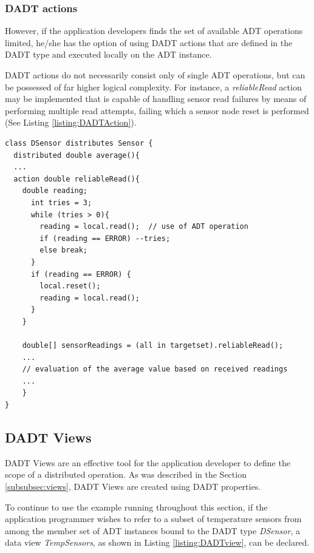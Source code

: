 \subsubsection{DADT actions}
However, if the application developers finds the set of available ADT operations limited, he/she has the option of using DADT actions that are defined in the DADT type and executed locally on the ADT instance.

DADT actions do not necessarily consist only of single ADT operations, but can
be possessed of far higher logical complexity. For instance, a
\emph{reliableRead} action may be implemented that is capable of handling sensor read failures by means of performing multiple read attempts, failing which
a sensor node reset is performed (See Listing \ref{listing:DADTAction}).
 
\begin{lstlisting}[frame=trbl, basewidth={0.55em, 0.6em}, captionpos=b, 
basicstyle=\ttfamily\footnotesize, breaklines, caption = Use of DADT Action (reproduced from \cite{migliavacca_DADT:2006}), label = listing:DADTAction]  
class DSensor distributes Sensor {
  distributed double average(){
  ...  
  action double reliableRead(){
    double reading;
      int tries = 3;
      while (tries > 0){
        reading = local.read();  // use of ADT operation
        if (reading == ERROR) --tries;
        else break; 
      }
      if (reading == ERROR) {
        local.reset();
        reading = local.read();
      }
    }

    double[] sensorReadings = (all in targetset).reliableRead();
    ...
    // evaluation of the average value based on received readings	
    ...
    }
}
\end{lstlisting}

\subsection{DADT Views} \label{subsubsec:viewsImpl}

DADT Views are an effective tool for the application developer to
define the scope of a distributed operation. As was described in the Section
\ref{subsubsec:views}, DADT Views are created using DADT properties.

To continue to use the example running throughout this section, if the application programmer wishes to refer to a subset of temperature sensors from among the member set of ADT instances bound to the DADT type \emph{DSensor}, a data view \emph{TempSensors}, 
as shown in Listing \ref{listing:DADTview}, can be declared.
  
